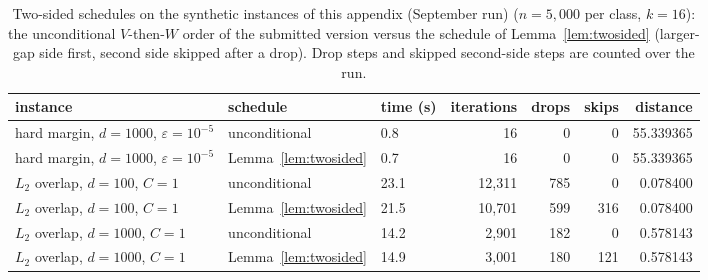 \documentclass{opt2026}   %
\begin{document}
\begin{table}[h]\centering\scriptsize
\caption{Two-sided schedules on the synthetic instances of this appendix (September run) ($n{=}5{,}000$ per class, $k{=}16$): the unconditional $V$-then-$W$ order of the submitted version versus the schedule of Lemma~\ref{lem:twosided} (larger-gap side first, second side skipped after a drop). Drop steps and skipped second-side steps are counted over the run.}\label{tab:sched}
\begin{tabular}{lllrrrr}\toprule
instance & schedule & time (s) & iterations & drops & skips & distance \\\midrule
hard margin, $d{=}1000$, $\varepsilon{=}10^{-5}$ & unconditional & 0.8 & 16 & 0 & 0 & 55.339365 \\
hard margin, $d{=}1000$, $\varepsilon{=}10^{-5}$ & Lemma~\ref{lem:twosided} & 0.7 & 16 & 0 & 0 & 55.339365 \\
\midrule
$L_2$ overlap, $d{=}100$, $C{=}1$ & unconditional & 23.1 & 12,311 & 785 & 0 & 0.078400 \\
$L_2$ overlap, $d{=}100$, $C{=}1$ & Lemma~\ref{lem:twosided} & 21.5 & 10,701 & 599 & 316 & 0.078400 \\
\midrule
$L_2$ overlap, $d{=}1000$, $C{=}1$ & unconditional & 14.2 & 2,901 & 182 & 0 & 0.578143 \\
$L_2$ overlap, $d{=}1000$, $C{=}1$ & Lemma~\ref{lem:twosided} & 14.9 & 3,001 & 180 & 121 & 0.578143 \\
\bottomrule
\end{tabular}\end{table}
\end{document}
